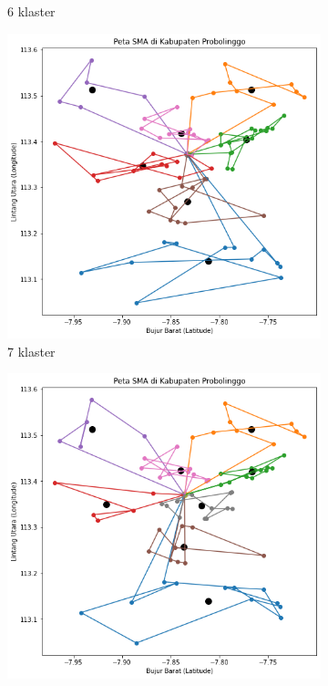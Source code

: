 \begin{figure}[H]
\begin{subfigure}[b]{0.3\textwidth}
		\caption{6 klaster}	
	\end{subfigure}
	\hfill
	\begin{subfigure}[b]{0.3\textwidth}
		\includegraphics[width=\textwidth]{Gambar/Klaster/7.png}
		\caption{7 klaster}	
	\end{subfigure}
	\hfill
	\begin{subfigure}[b]{0.3\textwidth}
		\includegraphics[width=\textwidth]{Gambar/Klaster/8.png}

\end{subfigure}
\end{figure}
